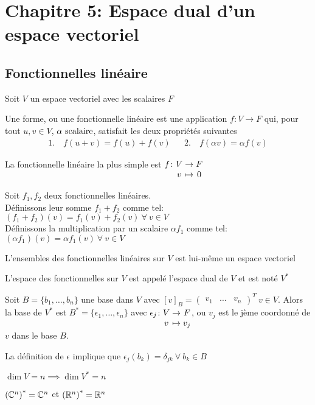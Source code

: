 \section{Chapitre 5: Espace dual d'un espace vectoriel}

\subsection{Fonctionnelles linéaire}
Soit $V$ un espace vectoriel avec les scalaires $F$
\begin{definition}
    Une forme, ou une fonctionnelle linéaire est une application
    $f\colon V \to F$ qui, pour tout $u, v \in V$, $\alpha \text{ scalaire}$,
    satisfait les deux propriétés suivantes
    \begin{align*}
        1. \quad f(u + v) = f(u) + f(v)& &2. \quad f(\alpha v) = \alpha f(v)
    \end{align*}
\end{definition}
\begin{remark}
    La fonctionnelle linéaire la plus simple est $\myfunc{f}{V}{F}{v}{0}$
\end{remark}
\begin{definition}
    Soit $f_1, f_2$ deux fonctionnelles linéaires. \\
    Définissons leur somme $f_1 + f_2$ comme tel:
    $(f_1 + f_2)(v) = f_1(v) + f_2(v) \ \forall \ v \in V $ \\
    Définissons la multiplication par un scalaire $\alpha f_1$ comme tel: 
    $(\alpha f_1)(v) = \alpha f_1(v) \ \forall \ v \in V$
\end{definition}
\begin{lemma}
    L'ensembles des fonctionnelles linéaires sur $V$ est lui-même un espace vectoriel
\end{lemma}
\begin{definition}
    L'espace des fonctionnelles sur $V$ est appelé l'espace dual de $V$ et est noté $V^*$
\end{definition}
\begin{theorem}
    Soit $B = \{b_1, \dots, b_n\}$ une base dans $V$ avec $[v]_B = \begin{pmatrix}
        v_1 & \dots & v_n \end{pmatrix}^T \ v \in V$. 
    Alors la base de $V^*$ est $B^* = \{\epsilon_1, \dots, \epsilon_n\}$ avec 
    $\myfunc{\epsilon_j}{V}{F}{v}{v_j}$, ou $v_j$ est le jème coordonné de $v$ dans le base $B$.
\end{theorem}
\begin{remark}
    La définition de $\epsilon$ implique que $\epsilon_j(b_k) = \delta_{jk} \ \forall \ b_k \in B$
\end{remark}
\begin{corollary}
    $\dim V = n \implies \dim V^* = n$
\end{corollary}
\begin{corollary}
    $\left(\mathbb{C}^n\right)^* = \mathbb{C}^n$ et $\left(\mathbb{R}^n\right)^* = \mathbb{R}^n$ 
\end{corollary}

